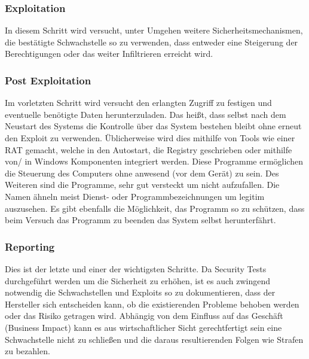     \subsubsection{\glqq Exploitation\grqq{}}
        In diesem Schritt wird versucht, unter Umgehen weitere Sicherheitsmechanismen, die bestätigte Schwachstelle so zu verwenden, dass entweder eine Steigerung der Berechtigungen oder das weiter Infiltrieren erreicht wird.
        \subsubsection{\glqq Post Exploitation\grqq{}}
        Im vorletzten Schritt wird versucht den erlangten Zugriff zu festigen und eventuelle benötigte Daten herunterzuladen. Das heißt, dass selbst nach dem Neustart des Systems die Kontrolle über das System bestehen bleibt ohne erneut den Exploit zu verwenden. Üblicherweise wird dies mithilfe von Tools wie einer \ac{RAT} gemacht, welche in den Autostart, die Registry geschrieben oder mithilfe von/ in Windows Komponenten integriert werden.
        Diese Programme ermöglichen die Steuerung des Computers ohne anwesend (vor dem Gerät) zu sein. Des Weiteren sind die Programme, sehr gut versteckt um nicht aufzufallen. Die Namen ähneln meist Dienst- oder Programmbezeichnungen um legitim auszusehen. Es gibt ebenfalls die Möglichkeit, das Programm so zu schützen, dass beim Versuch das Programm zu beenden das System selbst herunterfährt.
    \subsubsection{\glqq Reporting\grqq{}}
        Dies ist der letzte und einer der wichtigsten Schritte. Da Security Tests durchgeführt werden um die Sicherheit zu erhöhen, ist es auch zwingend notwendig die Schwachstellen und Exploits so zu dokumentieren, dass der Hersteller sich entscheiden kann, ob die existierenden Probleme behoben werden oder das Risiko getragen wird. Abhängig von dem Einfluss auf das Geschäft (Business Impact) kann es aus wirtschaftlicher Sicht gerechtfertigt sein eine Schwachstelle nicht zu schließen und die daraus resultierenden Folgen wie Strafen zu bezahlen.
